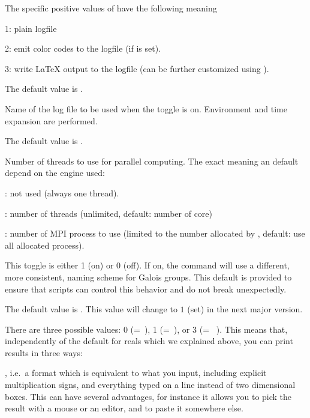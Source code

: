 {The specific positive values of  have the following meaning

1: plain logfile

2: emit color codes to the logfile (if  is set).

3: write LaTeX output to the logfile (can be further customized using
).

The default value is .

\label{se:def,logfile}
Name of the log file to be used when the  toggle is on.
Environment and time expansion are performed.

The default value is .

\label{se:def,nbthreads}
Number of threads to use for parallel computing.
The exact meaning an default depend on the  engine used:

\item {}: not used (always one thread).

\item {}: number of threads (unlimited, default: number of core)

\item {}: number of MPI process to use (limited to the number allocated by ,
default: use all allocated process).

\label{se:def,new_galois_format}
This toggle is either 1 (on) or 0 (off). If on,
the  command will use a different, more
consistent, naming scheme for Galois groups. This default is provided to
ensure that scripts can control this behavior and do not break unexpectedly.

The default value is . This value will change to $1$ (set) in the next
major version.

\label{se:def,output}
There are three possible values: 0
(=~), 1 (=~), or 3
(=~ ). This
means that, independently of the default  for reals which we
explained above, you can print results in three ways:

\item {}, i.e.~a format which is equivalent to what you
input, including explicit multiplication signs, and everything typed on a
line instead of two dimensional boxes. This can have several advantages, for
instance it allows you to pick the result with a mouse or an editor, and to
paste it somewhere else.

}
